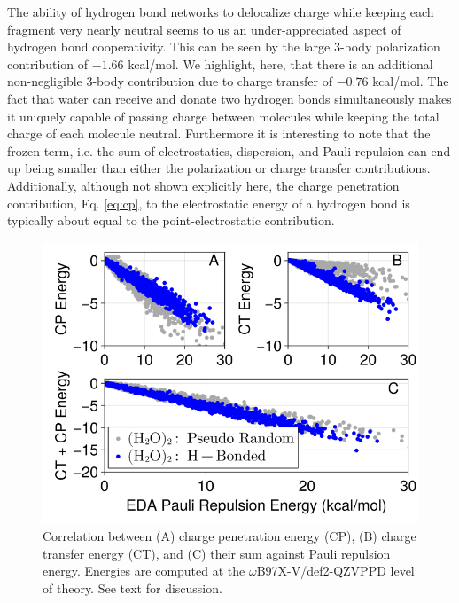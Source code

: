 \documentclass[journal=jctcce,manuscript=article]{achemso}
\begin{document}
The ability of hydrogen bond networks to delocalize charge while keeping each fragment very nearly neutral seems to us an under-appreciated aspect of hydrogen bond cooperativity. This can be seen by the large 3-body polarization contribution of $-1.66$ kcal/mol. We highlight, here, that there is an additional non-negligible 3-body contribution due to charge transfer of $-0.76$ kcal/mol. The fact that water can receive and donate two hydrogen bonds simultaneously makes it uniquely capable of passing charge between molecules while keeping the total charge of each molecule neutral. Furthermore it is interesting to note that the frozen term, i.e. the sum of electrostatics, dispersion, and Pauli repulsion can end up being smaller than either the polarization or charge transfer contributions. Additionally, although not shown explicitly here, the charge penetration contribution, Eq. \ref{eq:cp}, to the electrostatic energy of a hydrogen bond is typically about equal to the point-electrostatic contribution. 
\begin{figure}[H]
  \includegraphics*[width=\textwidth]{figures/pauli_ct_cp_correlation.png}
  \caption{Correlation between (A) charge penetration energy (CP), (B) charge transfer energy (CT),
  and (C) their sum against Pauli repulsion energy.
  Energies are computed at the $\omega$B97X-V/def2-QZVPPD level of theory. See text for discussion.}
  \label{fig:cp_ct_pauli}
\end{figure}
\end{document}
